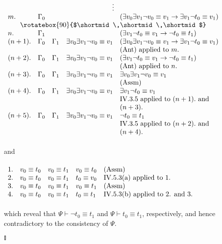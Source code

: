 \begin{enumerate}[1.]
\begin{math}
\begin{array}{lllll}
\multicolumn{5}{c}{\vdots} \cr
m. & \Gamma_0 & \ & \ & (\exists v_0 \exists v_1 \neg v_0 \equiv v_1 \rightarrow \exists v_1 \neg t_0 \equiv v_1) \cr
\multicolumn{5}{c}{\mbox{\rotatebox{90}{$\shortmid\,\shortmid\,\shortmid$}}} \cr
n. & \Gamma_1 & \ & \ & (\exists v_1 \neg t_0 \equiv v_1 \rightarrow \neg t_0 \equiv t_1) \cr
(n+1). & \Gamma_0 & \Gamma_1 & \exists v_0 \exists v_1 \neg v_0 \equiv v_1 & (\exists v_0 \exists v_1 \neg v_0 \equiv v_1 \rightarrow \exists v_1 \neg t_0 \equiv v_1) \cr
\ & \ & \ & \ & \mbox{(Ant) applied to $m$.} \cr
(n+2). & \Gamma_0 & \Gamma_1 & \exists v_0 \exists v_1 \neg v_0 \equiv v_1 & (\exists v_1 \neg t_0 \equiv v_1 \rightarrow \neg t_0 \equiv t_1) \cr
\ & \ & \ & \ & \mbox{(Ant) applied to $n$.} \cr
(n+3). & \Gamma_0 & \Gamma_1 & \exists v_0 \exists v_1 \neg v_0 \equiv v_1 & \exists v_0 \exists v_1 \neg v_0 \equiv v_1 \cr
\ & \ & \ & \ & \mbox{(Assm)} \cr
(n+4). & \Gamma_0 & \Gamma_1 & \exists v_0 \exists v_1 \neg v_0 \equiv v_1 & \exists v_1 \neg t_0 \equiv v_1 \cr
\ & \ & \ & \ & \mbox{IV.3.5 applied to $(n+1).$ and} \cr
\ & \ & \ & \ & (n+3). \cr
(n+5). & \Gamma_0 & \Gamma_1 & \exists v_0 \exists v_1 \neg v_0 \equiv v_1 & \neg t_0 \equiv t_1 \cr
\ & \ & \ & \ & \mbox{IV.3.5 applied to $(n+2).$ and} \cr
\ & \ & \ & \ & (n+4).
\end{array}
\end{math}
\\ \ \\and\\ \ \\ \phantom{an}
\begin{math}
\begin{array}{lllll}
1. & v_0 \equiv t_0 & v_0 \equiv t_1 & v_0 \equiv t_0 & \mbox{(Assm)} \cr
2. & v_0 \equiv t_0 & v_0 \equiv t_1 & t_0 \equiv v_0 & \mbox{IV.5.3(a) applied to 1.} \cr
3. & v_0 \equiv t_0 & v_0 \equiv t_1 & v_0 \equiv t_1 & \mbox{(Assm)} \cr
4. & v_0 \equiv t_0 & v_0 \equiv t_1 & t_0 \equiv t_1 & \mbox{IV.5.3(b) applied to 2. and 3.}
\end{array}
\end{math}
\\ \ \\which reveal that $\Psi \vdash \neg t_0 \equiv t_1$ and $\Psi \vdash t_0 \equiv t_1$, respectively, and hence contradictory to the consistency of $\Psi$.\begin{flushright}$\talloblong$\end{flushright}
\end{enumerate}
